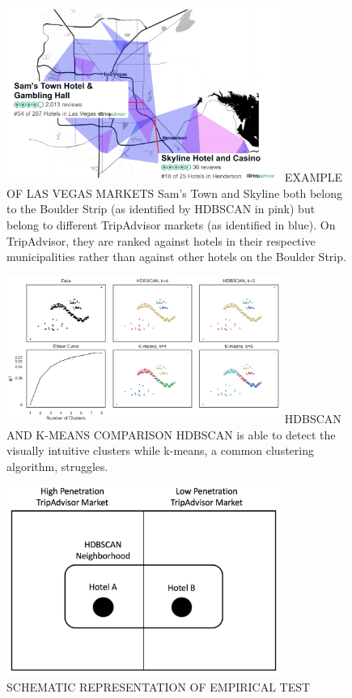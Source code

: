 \documentclass{informs_mod} %
\begin{document}
\begin{figure}[htp]
\FIGURE
{\includegraphics[width=0.8\textwidth,height=\textheight,keepaspectratio]{./Figures/LasVegasMarkets.png}}
{EXAMPLE OF LAS VEGAS MARKETS\label{fig:vegas}}
{Sam's Town and Skyline both belong to the Boulder Strip (as identified by HDBSCAN in pink) but belong to different TripAdvisor markets (as identified in blue). On TripAdvisor, they are ranked against hotels in their respective municipalities rather than against other hotels on the Boulder Strip.}
\end{figure}
\clearpage

\begin{figure}[htp]
\FIGURE
{\includegraphics[width=0.8\textwidth,height=\textheight,keepaspectratio]{./Figures/clusters.png}}
{HDBSCAN AND K-MEANS COMPARISON\label{fig:cluster}}
{HDBSCAN is able to detect the visually intuitive clusters while k-means, a common clustering algorithm, struggles.}
\end{figure}
\clearpage


\begin{figure}[htp]
\FIGURE
{\includegraphics[width=0.8\textwidth,height=\textheight,keepaspectratio]{./Figures/Schematic.png}}
{SCHEMATIC REPRESENTATION OF EMPIRICAL TEST\label{fig:abmarkets}}
{}
\end{figure}
\clearpage
\end{document}
